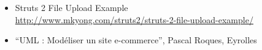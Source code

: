 \begin{itemize}
	
\item Struts 2 File Upload Example \\
\url{http://www.mkyong.com/struts2/struts-2-file-upload-example/}

\item “UML : Modéliser un site e-commerce”, Pascal Roques, Eyrolles


\end{itemize}